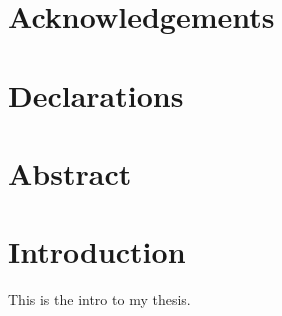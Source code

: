 \documentclass[a4paper, 12pt]{report}
\newcommand{\projects}{/Users/fgu/dev/projects}
\newcommand{\mlbt}{\projects/mlbt/text/paper/sections}
\newcommand{\entropy}{\projects/entropy/text/paper/sections}
\newcommand{\eval}{\projects/mdb_eval/text/paper/sections}
\begin{document}
\maketitlepage

\tableofcontents
\listoftables
\listoffigures

\chapter*{Acknowledgements}
\chapter*{Declarations}
\chapter*{Abstract}

\clearpage
{}

\chapter*{Introduction}%
\label{cha:introduction}

This is the intro to my thesis.

% 
% 
% 
% 
% 

% 
% 
% 
% 
% 
% 
% 
% 

% 
% 
% 
% 
% 
% 

\newpage
\printbibliography
\end{document}
